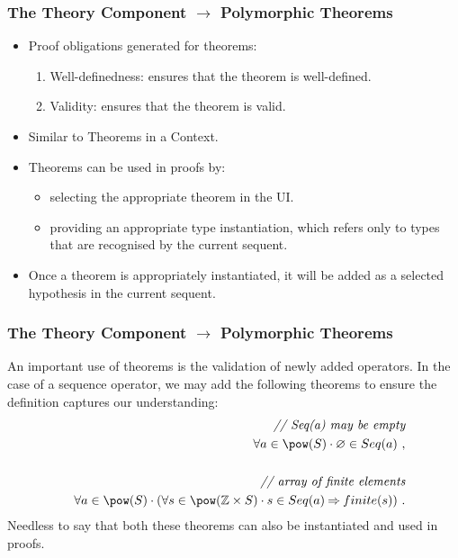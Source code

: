 \documentclass{beamer}
\begin{document}
	\begin{frame}
		\frametitle{The Theory Component $\rightarrow$ Polymorphic Theorems}
		\begin{itemize}
			\item Proof obligations generated for theorems:
				\begin{enumerate}
					\item Well-definedness: ensures that the theorem is well-defined.
					\item Validity: ensures that the theorem is valid.
				\end{enumerate}
			\item Similar to Theorems in a Context.
			\item Theorems can be used in proofs by:
				\begin{itemize}
					\item selecting the appropriate theorem in the UI.
					\item providing an appropriate type instantiation, which refers only to types that are recognised by the current sequent.
				\end{itemize}
			\item Once a theorem is appropriately instantiated, it will be added as a selected hypothesis in the current sequent.
		\end{itemize}
	\end{frame}
	\begin{frame}
		\frametitle{The Theory Component $\rightarrow$ Polymorphic Theorems}
		An important use of theorems is the validation of newly added operators. In the case of a sequence operator, we may add the following theorems to ensure the definition captures our understanding:
		\begin{eqnarray*}
			&& \textit{// Seq(a) may be empty} \\
			&&\forall a \in \pow(S) \cdot \emptyset \in Seq(a) ~,\\
			&&~\\
			&&\textit{// array of finite elements}\\
			&&\forall a \in \pow(S) \cdot (\forall s \in \pow(\mathbb{Z}\times S)\cdot s \in Seq(a) \limp finite(s)) ~.
		\end{eqnarray*}
		Needless to say that both these theorems can also be instantiated and used in proofs.
	\end{frame}
\end{document}
